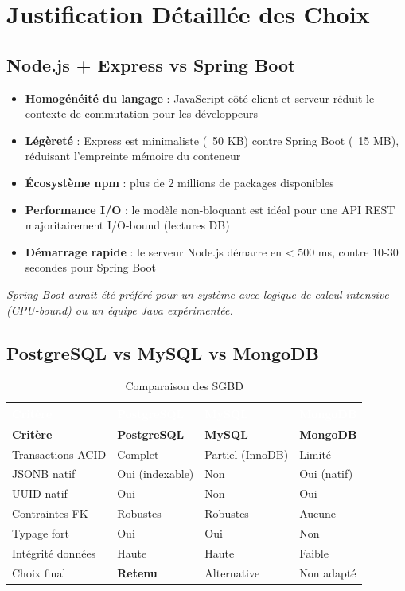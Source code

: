 \documentclass[12pt,a4paper]{report}
\begin{document}
\section{Justification Détaillée des Choix}

\subsection{Node.js + Express vs Spring Boot}

\begin{tcolorbox}[infobox, title=Pourquoi Node.js plutôt que Spring Boot ?]
\begin{itemize}
    \item \textbf{Homogénéité du langage} : JavaScript côté client et serveur réduit le contexte de commutation pour les développeurs
    \item \textbf{Légèreté} : Express est minimaliste (~50 KB) contre Spring Boot (~15 MB), réduisant l'empreinte mémoire du conteneur
    \item \textbf{Écosystème npm} : plus de 2 millions de packages disponibles
    \item \textbf{Performance I/O} : le modèle non-bloquant est idéal pour une API REST majoritairement I/O-bound (lectures DB)
    \item \textbf{Démarrage rapide} : le serveur Node.js démarre en < 500 ms, contre 10-30 secondes pour Spring Boot
\end{itemize}
\textit{Spring Boot aurait été préféré pour un système avec logique de calcul intensive (CPU-bound) ou un équipe Java expérimentée.}
\end{tcolorbox}

\subsection{PostgreSQL vs MySQL vs MongoDB}

\begin{longtable}{|L{3cm}|L{3.5cm}|L{3.5cm}|L{3.5cm}|}
\caption{Comparaison des SGBD} \\
\hline
{}\textcolor{white}{\textbf{Critère}} & \textcolor{white}{\textbf{PostgreSQL}} & \textcolor{white}{\textbf{MySQL}} & \textcolor{white}{\textbf{MongoDB}} \\
\hline
\endfirsthead
\hline
\textbf{Critère} & \textbf{PostgreSQL} & \textbf{MySQL} & \textbf{MongoDB} \\
\hline
\endhead
Transactions ACID & Complet & Partiel (InnoDB) & Limité \\
\hline
JSONB natif & Oui (indexable) & Non & Oui (natif) \\
\hline
UUID natif & Oui & Non & Oui \\
\hline
Contraintes FK & Robustes & Robustes & Aucune \\
\hline
Typage fort & Oui & Oui & Non \\
\hline
Intégrité données & Haute & Haute & Faible \\
\hline
Choix final & \textbf{Retenu} & Alternative & Non adapté \\
\hline
\end{longtable}
\end{document}
